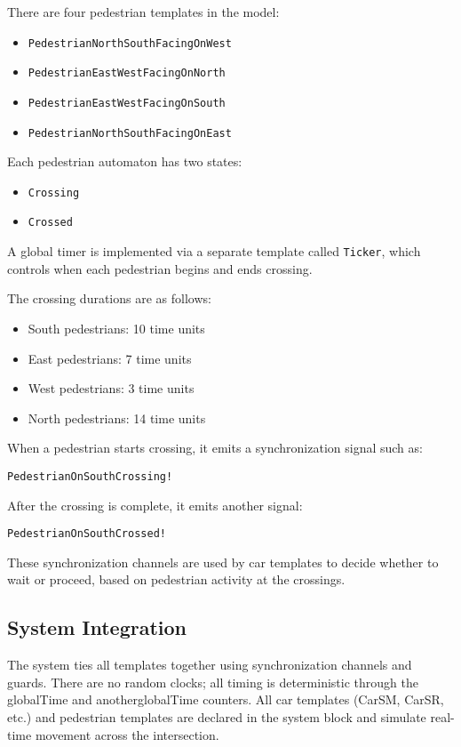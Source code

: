 \documentclass[conference]{IEEEtran}
\begin{document}
There are four pedestrian templates in the model:
\\
\begin{itemize}
    \item \texttt{PedestrianNorthSouthFacingOnWest}
    \item \texttt{PedestrianEastWestFacingOnNorth}
    \item \texttt{PedestrianEastWestFacingOnSouth}
    \item \texttt{PedestrianNorthSouthFacingOnEast}\\
\end{itemize}
Each pedestrian automaton has two states:
\begin{itemize}
    \item \texttt{Crossing}
    \item \texttt{Crossed}
\end{itemize}
A global timer is implemented via a separate template called \texttt{Ticker}, which controls when each pedestrian begins and ends crossing.

The crossing durations are as follows:
\begin{itemize}
    \item South pedestrians: 10 time units
    \item East pedestrians: 7 time units
    \item West pedestrians: 3 time units
    \item North pedestrians: 14 time units
\end{itemize}

When a pedestrian starts crossing, it emits a synchronization signal such as:
\begin{center}
    \texttt{PedestrianOnSouthCrossing!}
\end{center}

After the crossing is complete, it emits another signal:
\begin{center}
    \texttt{PedestrianOnSouthCrossed!}
\end{center}

These synchronization channels are used by car templates to decide whether to wait or proceed, based on pedestrian activity at the crossings.

\subsection{System Integration}

The system ties all templates together using synchronization channels and guards. There are no random clocks; all timing is deterministic through the globalTime and anotherglobalTime counters. All car templates (CarSM, CarSR, etc.) and pedestrian templates are declared in the system block and simulate real-time movement across the intersection.
\end{document}

